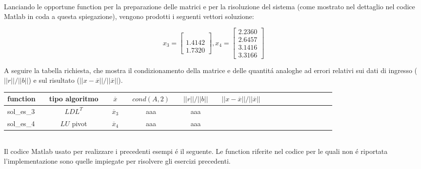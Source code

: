 \noindent Lanciando le opportune function per la preparazione delle matrici e per la risoluzione del sistema (come mostrato nel dettaglio nel codice Matlab in coda a questa spiegazione), vengono prodotti i seguenti vettori soluzione:

\[ %
x_3 = \begin{bmatrix}  \\  \\ 1.4142 \\ 1.7320 \end{bmatrix},
x_4 = \begin{bmatrix} 2.2360 \\ 2.6457 \\ 3.1416 \\ 3.3166 \end{bmatrix}
\]

\noindent A seguire la tabella richiesta, che mostra il condizionamento della matrice e delle quantit\'a analoghe ad errori relativi sui dati di ingresso (\(||r||/||b||\)) e sul risultato (\(||x-\overline{x}||/||\overline{x}||\)).


\begin{tabular}{l*{20}{c}}
function & \vline& tipo algoritmo & \vline& \(\overline{x}\) & \vline& \(cond(A, 2)\) & \vline& \(||r||/||b||\) & \vline& \(||x-\overline{x}||/||\overline{x}||\) \\
\hline
sol\_es\_3 & \vline& \(LDL^T\)    & \vline& \(\overline{x}_3\) & \vline& aaa      & \vline& aaa	 \\
sol\_es\_4 & \vline& \(LU\) pivot & \vline& \(\overline{x}_4\) & \vline& aaa      & \vline& aaa	 \\

\end{tabular} \\

\noindent Il codice Matlab usato per realizzare i precedenti esempi \'e il seguente. Le function riferite nel codice per le quali non \'e riportata l'implementazione sono quelle impiegate per risolvere gli esercizi precedenti.

